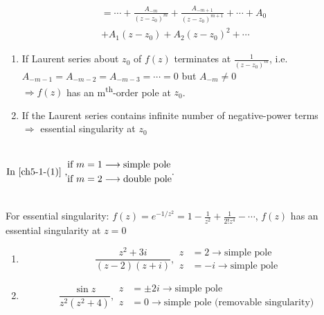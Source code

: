 \begin{itemize}
\begin{align*}
&= \cdots + \frac{A_{-m}}{\left(z-z_0\right)^m} + \frac{A_{-m+1}}{\left(z-z_0\right)^{m+1}} + \cdots + A_0 \\ 
&+ A_1\left(z-z_0\right) + A_2\left(z-z_0\right)^2 + \cdots
\end{align*}
\begin{enumerate}[label = \protect\circled{\arabic*}]
\item \label{ch5-1-(1)} If Laurent series about $z_0$ of $f(z)$ terminates at $\displaystyle\frac{1}{\left(z-z_0\right)^m}$, i.e. $A_{-m-1} = A_{-m-2} = A_{-m-3} = \cdots = 0$ but $A_{-m}\neq 0$\\
$\Longrightarrow f(z)$ has an m\textsuperscript{th}-order pole at $z_0$. 
\item \label{ch5-1-(2)} If the Laurent series contains infinite number of negative-power terms\\
$\Longrightarrow$ essential singularity at $z_0$
\end{enumerate}
\begin{note}\mbox{}\\
$
\text{In \ref{ch5-1-(1)} ,}
\begin{aligned}
\text{if }m=1 &\longrightarrow\text{simple pole} \\
\text{if }m=2 &\longrightarrow\text{double pole} \\
\end{aligned}.
$
\begin{example}\mbox{}\\
For essential singularity: $\displaystyle f(z) = e^{-1/z^2} = 1-\frac{1}{z^2}+\frac{1}{2!z^4} - \cdots$, $f(z)$ has an essential singularity at $z=0$
\begin{enumerate}[label = \protect\circled{\arabic*}]
\item 
\[
\frac{z^2+3i}{\left(z-2\right)\left(z+i\right)},
\begin{aligned}
z &= 2 \longrightarrow \text{simple pole} \\
z &= -i \longrightarrow \text{simple pole}
\end{aligned}
\]
\item 
\[
\frac{\sin z}{z^2\left(z^2+4\right)},
\begin{aligned}
z &= \pm 2i \longrightarrow \text{simple pole} \\
z &= 0 \longrightarrow \text{simple pole (removable singularity)} 
\end{aligned}
\]
\end{enumerate}
\end{example}
\end{note}

\end{itemize}
